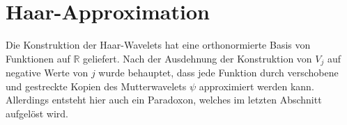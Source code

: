 %
%
%
\section{Haar-Approximation
\label{haar:approximation}}
Die Konstruktion der Haar-Wavelets hat eine orthonormierte Basis von
Funktionen auf $\mathbb R$ geliefert.
Nach der Ausdehnung der Konstruktion von $V_j$ auf negative Werte von $j$
wurde behauptet, dass jede Funktion durch verschobene und gestreckte 
Kopien des Mutterwavelets $\psi$ approximiert werden kann.
Allerdings entsteht hier auch ein Paradoxon, welches im letzten Abschnitt
aufgelöst wird.


